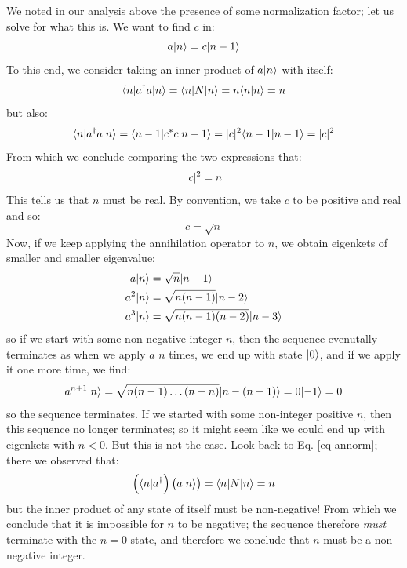 We noted in our analysis above the presence of some normalization factor; let us solve for what this is. We want to find $c$ in:
\begin{equation}
    a\lvert n \rangle = c\lvert n-1 \rangle
\end{equation}
To this end, we consider taking an inner product of $a\lvert n \rangle$ with itself:
\begin{equation}\label{eq-annorm}
    \langle n \rvert a^\dag a \lvert n \rangle = \langle n \rvert N\lvert n \rangle = n\langle n \lvert n \rangle = n
\end{equation}
but also:
\begin{equation}
    \langle n \rvert a^\dag a \lvert n \rangle = \langle n-1 \rvert c^* c \lvert n-1 \rangle = \lvert c \rvert^2\langle n-1 \lvert n-1 \rangle = \lvert c \rvert^2
\end{equation}
From which we conclude comparing the two expressions that:
\begin{equation}
    \lvert c \rvert^2 = n
\end{equation}
This tells us that $n$ must be real. By convention, we take $c$ to be positive and real and so:
\begin{equation}
    c = \sqrt{n}
\end{equation}
Now, if we keep applying the annihilation operator to $n$, we obtain eigenkets of smaller and smaller eigenvalue:
\begin{equation}
    \begin{split}
        a\lvert n \rangle &= \sqrt{n}\lvert n-1 \rangle
        \\ a^2\lvert n \rangle &= \sqrt{n(n-1)}\lvert n-2 \rangle
        \\ a^3\lvert n \rangle &= \sqrt{n(n-1)(n-2)}\lvert n-3 \rangle
    \end{split}
\end{equation}
so if we start with some non-negative integer $n$, then the sequence evenutally terminates as when we apply $a$ $n$ times, we end up with state $\lvert 0 \rangle$, and if we apply it one more time, we find:
\begin{equation}
    a^{n+1}\lvert n \rangle = \sqrt{n(n-1) \ldots (n - n)}\lvert n - (n+1) \rangle = 0 \lvert -1 \rangle = 0
\end{equation}
so the sequence terminates. If we started with some non-integer positive $n$, then this sequence no longer terminates; so it might seem like we could end up with eigenkets with $n < 0$. But this is not the case. Look back to Eq. \eqref{eq-annorm}; there we observed that:
\begin{equation}
    \left(\langle n \rvert a^\dag\right)\left( a \lvert n \rangle\right) = \langle n \rvert N\lvert n \rangle = n
\end{equation}
but the inner product of any state of itself must be non-negative! From which we conclude that it is impossible for $n$ to be negative; the sequence therefore \emph{must} terminate with the $n = 0$ state, and therefore we conclude that $n$ must be a non-negative integer.


